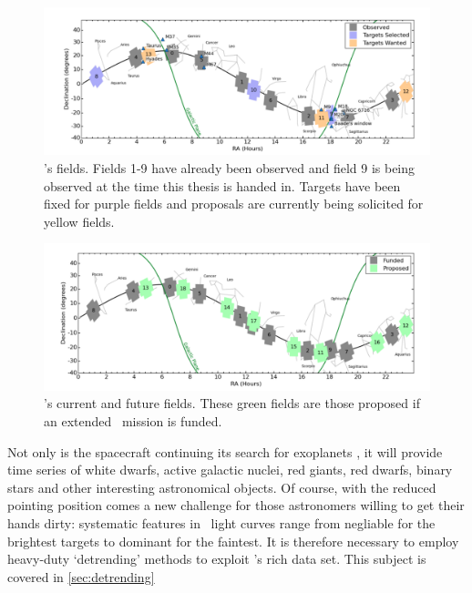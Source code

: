\begin{figure}[p]
\begin{center}
\includegraphics[width=6in, clip=true]{figures/Current_K2_fields.pdf}
\caption[Current \ktwo\ fields]{\ktwo's fields. Fields 1-9 have already been
observed and field 9 is being observed at the time this thesis is handed in.
Targets have been fixed for purple fields and proposals are currently being
solicited for yellow fields.}
\label{fig:current_fields}
\end{center}
\end{figure}

\begin{figure}[p]
\begin{center}
\includegraphics[width=6in, clip=true]{figures/Future_K2_fields.pdf}
\caption[Future \ktwo\ fields]{\ktwo's current and future fields. These green
fields are those proposed if an extended \ktwo\ mission is funded.}
\label{fig:future_fields}
\end{center}
\end{figure}

Not only is the spacecraft continuing its search for exoplanets \citep[and has
already discovered many, \eg][]{Vanderburg2015, Crossfield2015,
Foreman-Mackey2015, Montet2015, Becker2015, Vanderburg2016}, it will
provide time series of white dwarfs, active galactic nuclei, red giants, red
dwarfs, binary stars and other interesting astronomical objects.
Of course, with the reduced pointing position comes a new challenge for those
astronomers willing to get their hands dirty: systematic features in \ktwo\
light curves range from negliable for the brightest targets to dominant for
the faintest.
It is therefore necessary to employ heavy-duty `detrending' methods to
exploit \ktwo's rich data set.
This subject is covered in \textsection \ref{sec:detrending}

